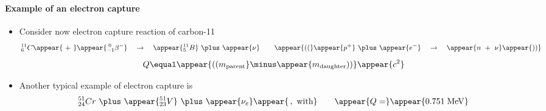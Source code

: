 \begin{frame}
\frametitle{\texorpdfstring{\culine[\sectiontitleulinecolor]{\sectiontitle}}{\sectiontitle} }
\framesubtitle{Example of an electron capture}

% 
\begin{itemize}
	\item Consider now electron capture reaction of carbon-11
\[
{ }_{6}^{11} C \appear{~+~} \appear{ _{-1}^{\;0} \beta^{-}} \quad \rightarrow \quad \appear{{ }_{5}^{11} B}  ~\plus~ \appear{\nu} \qquad \appear{\textrm{((}} \appear{p^{+}}  ~\plus~ \appear{e^{-}} \quad \rightarrow \quad  \appear{n~+~\nu} \appear{\textrm{))}}
\]
  
\[
Q  \equal  \appear{\textrm{((} m_{\text {parent}}}  \minus \appear{m_{\text {daughter}} \textrm{))} } \appear{c^{2}}
\]

\item Another typical example of electron capture is 
\[
 { }_{24}^{51} C r  ~\plus~ \appear{{ }_{23}^{51} V}  ~\plus~ \appear{\nu_{e}} \appear{\,,~ \text{with}} \qquad  \appear{Q=}\appear{0.751 \mathrm{\;MeV}}
 \]
\end{itemize}


\endofslide 
\end{frame}

